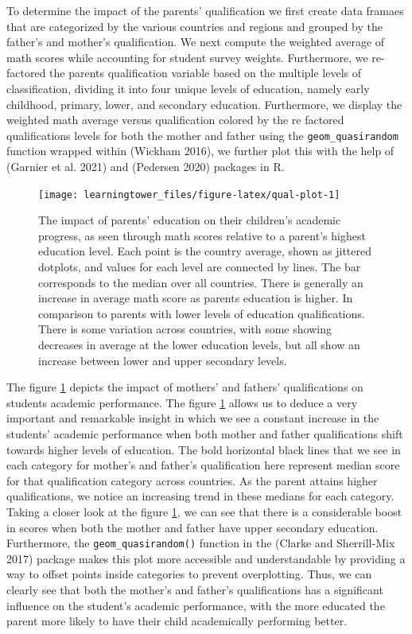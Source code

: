 To determine the impact of the parents' qualification we first create data framaes that are categorized by the various countries and regions and grouped by the father's and mother's qualification. We next compute the weighted average of math scores while accounting for student survey weights. Furthermore, we re-factored the parents qualification variable based on the multiple levels of classification, dividing it into four unique levels of education, namely early childhood, primary, lower, and secondary education. Furthermore, we display the weighted math average versus qualification colored by the re factored qualifications levels for both the mother and father using the \texttt{geom\_quasirandom} function wrapped within  (Wickham 2016), we further plot this with the help of  (Garnier et al. 2021) and  (Pedersen 2020) packages in R.

\begin{figure}[H]
\texttt{[image: learningtower\_files/figure-latex/qual-plot-1]} \caption{The impact of parents' education on their children's academic progress, as seen through math scores relative to a parent's highest education level. Each point is the country average, shown as jittered dotplots, and values for each level are connected by lines. The bar corresponds to the median over all countries. There is generally an increase in average math score as parents education is higher. In comparison to parents with lower levels of education qualifications. There is some variation across countries, with some showing decreases in average at the lower education levels, but all show an increase between lower and upper secondary levels.}\label{fig:qual-plot}
\end{figure}

The figure \ref{fig:qual-plot} depicts the impact of mothers' and fathers' qualifications on students academic performance. The figure \ref{fig:qual-plot} allows us to deduce a very important and remarkable insight in which we see a constant increase in the students' academic performance when both mother and father qualifications shift towards higher levels of education. The bold horizontal black lines that we see in each category for mother's and father's qualification here represent median score for that qualification category across countries. As the parent attains higher qualifications, we notice an increasing trend in these medians for each category. Taking a closer look at the figure \ref{fig:qual-plot}, we can see that there is a considerable boost in scores when both the mother and father have upper secondary education. Furthermore, the \texttt{geom\_quasirandom()} function in the  (Clarke and Sherrill-Mix 2017) package makes this plot more accessible and understandable by providing a way to offset points inside categories to prevent overplotting. Thus, we can clearly see that both the mother's and father's qualifications has a significant influence on the student's academic performance, with the more educated the parent more likely to have their child academically performing better.

